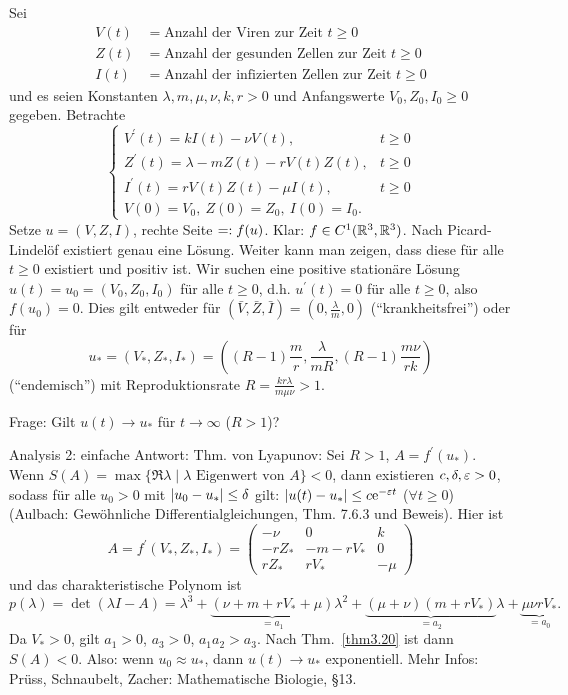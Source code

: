 \documentclass[a4paper,twoside,DIV15,BCOR12mm]{scrbook}
\begin{document}
\begin{bsp} \label{bsp3.21}
  Sei
  \begin{align*}
    V(t) &= \text{Anzahl der Viren zur Zeit } t\ge0\\
    Z(t) &= \text{Anzahl der gesunden Zellen zur Zeit } t\ge0\\
    I(t) &= \text{Anzahl der infizierten Zellen zur Zeit } t\ge0
  \end{align*}
  und es seien Konstanten $\lambda,m,\mu,\nu,k,r>0$ und Anfangswerte $V_0,Z_0,I_0\ge0$ gegeben. Betrachte
  \[ \begin{cases}
    V^\prime(t) = kI(t)-\nu V(t), &t\ge0\\
    Z^\prime(t) = \lambda - mZ(t) - rV(t)Z(t), &t\ge0\\
    I^\prime(t) = rV(t)Z(t) - \mu I(t), &t\ge0\\
    V(0)=V_0,\ Z(0)=Z_0,\ I(0)=I_0.
  \end{cases} \]
  Setze $u=(V,Z,I)$, rechte Seite $=: f(u)$. Klar: $f\in C^1(\mathbb{R}^3,\mathbb{R}^3)$. Nach Picard-Lindelöf existiert genau eine
  Lösung. Weiter kann man zeigen, dass diese für alle $t\ge0$ existiert und positiv ist. Wir suchen eine positive stationäre
  Lösung $u(t)=u_0=(V_0,Z_0,I_0)$ für alle $t\ge0$, d.h. $u^\prime(t)=0$ für alle $t\ge0$, also $f(u_0)=0$. Dies gilt entweder
  für $(\bar{V},\bar{Z},\bar{I})=(0,\frac{\lambda}{m},0)$ ("`krankheitsfrei"') oder für
  \[ u_* = (V_*,Z_*,I_*) = \left( (R-1)\frac{m}{r}, \frac{\lambda}{mR}, (R-1)\frac{m\nu}{rk} \right) \]
  ("`endemisch"') mit Reproduktionsrate $R=\frac{kr\lambda}{m\mu\nu}>1$.

  Frage: Gilt $u(t)\to u_*$ für $t\to\infty$ ($R>1$)?

  Analysis 2: einfache Antwort: Thm. von Lyapunov: Sei $R>1$, $A=f^\prime(u_*)$. Wenn
  $S(A)=\max{\{\Re{\lambda}\mid\lambda\text{ Eigenwert von } A\}}<0$, dann existieren $c,\delta,\varepsilon>0$, sodass für alle $u_0>0$
  mit $\left\lvert u_0-u_*\right\lvert\leq\delta$ gilt: $\left\lvert u(t)-u_*\right\lvert\leq c\mathrm{e}^{-\varepsilon t}$ ($\forall t\ge0$) (Aulbach: Gewöhnliche
  Differentialgleichungen, Thm. 7.6.3 und Beweis). Hier ist
  \[ A = f^\prime(V_*,Z_*,I_*) = \begin{pmatrix}-\nu&0&k\\-rZ_*&-m-rV_*&0\\rZ_*&rV_*&-\mu\end{pmatrix} \]
  und das charakteristische Polynom ist
  \[ p(\lambda) = \det{(\lambda I-A)} = \lambda^3 + \underbrace{(\nu+m+rV_*+\mu)}_{=a_1}\lambda^2 +
  \underbrace{(\mu+\nu)(m+rV_*)}_{=a_2}\lambda + \underbrace{\mu\nu rV_*}_{=a_0}. \]
  Da $V_*>0$, gilt $a_1>0$, $a_3>0$, $a_1a_2>a_3$. Nach Thm.~\ref{thm3.20} ist dann $S(A)<0$. Also: wenn $u_0\approx u_*$, dann
  $u(t)\to u_*$ exponentiell. Mehr Infos: Prüss, Schnaubelt, Zacher: Mathematische Biologie, §13.
\end{bsp}
\end{document}
